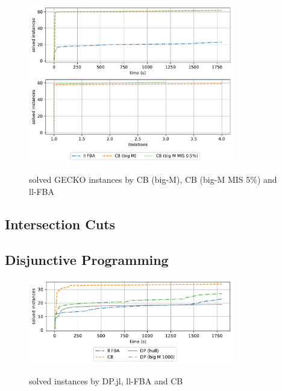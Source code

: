 \begin{figure}[h!]
    \caption{solved GECKO instances by CB (big-M), CB (big-M MIS 5\%) and ll-FBA}
    \centering
    \includegraphics[width=0.8\textwidth]{Images/comparison_solved_instances_gecko_1.0e-8.pdf}
    \label{fig:comparison_gecko}
\end{figure}

\subsection{Intersection Cuts}

\subsection{Disjunctive Programming}

\begin{figure}[h!]
    \caption{solved instances by DP.jl, ll-FBA and CB}
    \centering
    \includegraphics[width=0.8\textwidth]{Images/comparison_dp.pdf}
    \label{fig:}
\end{figure}


